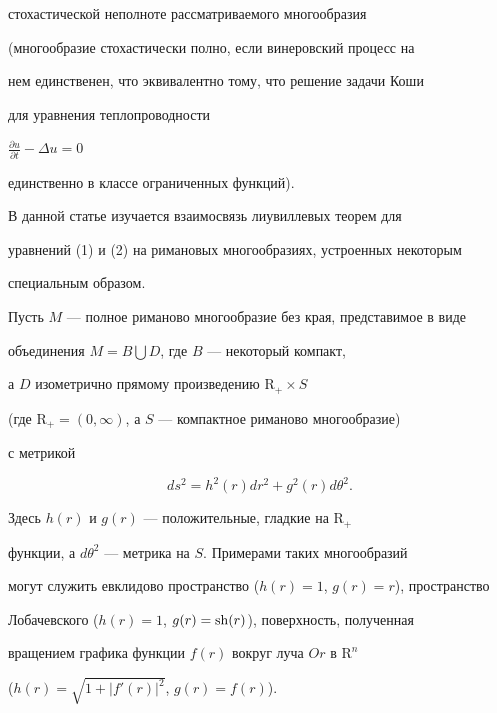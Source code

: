 стохастической неполноте рассматриваемого многообразия


(многообразие стохастически полно, если винеровский процесс на


нем единственен, что эквивалентно тому, что решение задачи Коши


для уравнения теплопроводности


$\frac{\partial u}{\partial t} -\Delta u = 0$


единственно в классе ограниченных функций).





В данной статье изучается взаимосвязь лиувиллевых теорем для


уравнений (1) и (2) на римановых многообразиях, устроенных некоторым


специальным образом.





Пусть $M$ --- полное риманово многообразие без края, представимое в виде


объединения $M = B \bigcup D$, где $B$ --- некоторый компакт,


а $D$ изометрично прямому произведению $\mathrm R_{+} \times S$


(где $\mathrm R_{+}=(0,\infty)$, а $S$ --- компактное риманово многообразие)


с метрикой


$$


ds^2=h^2(r)dr^2+g^2(r)d \theta ^2.


$$





Здесь $h(r)$ и $g(r)$ --- положительные, гладкие на $\mathrm R_{+}$


функции, а $d\theta^2$ --- метрика на $S$. Примерами таких многообразий


могут служить евклидово пространство ($h(r)=1$, $g(r)=r$), пространство


Лобачевского ($h(r)=1$, $g(r)=\operatorname{sh}(r)$), поверхность, полученная


вращением графика функции $f(r)$ вокруг луча $Or$ в $\mathrm R^n$


($h(r)=\sqrt{1+|f'(r)|^2}$, $g(r)=f(r)$).





